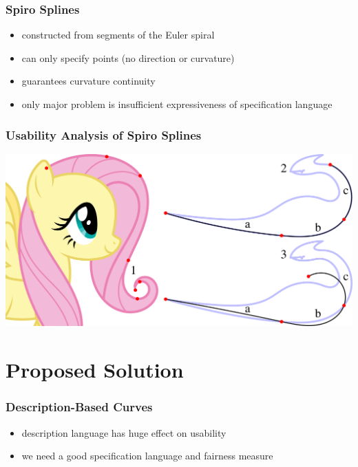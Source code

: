 \documentclass{beamer}
\begin{document}
		\begin{frame}
			\frametitle{Spiro Splines}
			\begin{itemize}
				\item constructed from segments of the Euler spiral
				\item can only specify points (no direction or curvature)
				\item guarantees curvature continuity
				\item only major problem is insufficient expressiveness of specification language
			\end{itemize}
		\end{frame}
		
		\begin{frame}
			\frametitle{Usability Analysis of Spiro Splines}
			\begin{centering}
				\includegraphics[width=\textwidth]{../resources/usability_spiro.pdf}\\
			\end{centering}
		\end{frame}
	
	\section{Proposed Solution}
	
		\begin{frame}
			\frametitle{Description-Based Curves}
			\begin{itemize}
				\item description language has huge effect on usability
				\item we need a good specification language and fairness measure
			\end{itemize}
		\end{frame}
	
\end{document}
